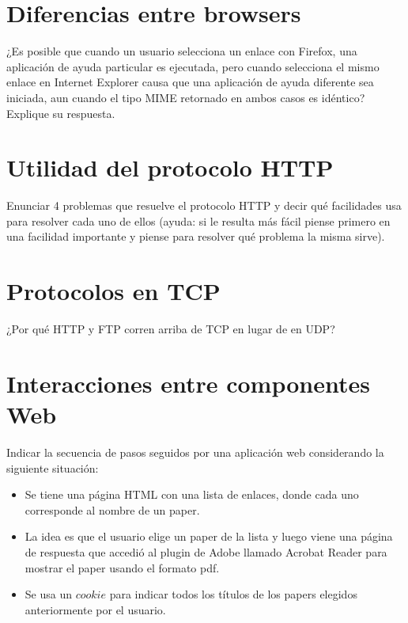 \documentclass[12pt]{report}
\begin{document}
\section{Diferencias entre browsers \sone}

¿Es posible que cuando un usuario selecciona un enlace con Firefox, una aplicación de ayuda particular es ejecutada, pero cuando selecciona el mismo enlace en Internet Explorer causa que una aplicación de ayuda diferente sea iniciada, aun cuando el tipo MIME retornado en ambos casos es
idéntico?\\ Explique su respuesta.

\section{Utilidad del protocolo HTTP \stwo}

Enunciar 4 problemas que resuelve el protocolo HTTP y decir qué facilidades usa
para resolver cada uno de ellos (ayuda: si le resulta más fácil piense primero en una facilidad
importante y piense para resolver qué problema la misma sirve).


\section{Protocolos en TCP \sone}

¿Por qué HTTP y FTP corren arriba de TCP en lugar de en UDP?

\section{Interacciones entre componentes Web \stwo}

Indicar la secuencia de pasos seguidos por una aplicación web considerando la
siguiente situación:

\begin{itemize}
\item Se tiene una página HTML con una lista de enlaces, donde cada uno corresponde al nombre de un paper.
\item La idea es que el usuario elige un paper de la lista y luego viene una página de respuesta que accedió al plugin de Adobe llamado Acrobat Reader para mostrar el paper usando el formato pdf.
\item Se usa un $cookie$ para indicar todos los títulos de los papers elegidos anteriormente por el usuario.
\end{itemize}
\end{document}
